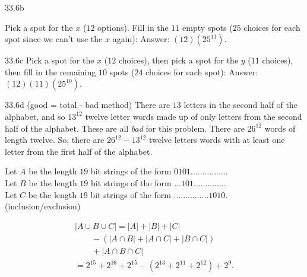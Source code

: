 \begin{Solution}{33.6b}


Pick a spot for the $x$ ($12$ options). Fill in the $11$ empty spots ($25$ choices for each spot since we can't use the $x$
again): Answer: $(12)(25^{11})$.

\end{Solution}

\begin{Solution}{33.6c}
Pick a spot for the $x$ ($12$ choices), then pick a spot for the $y$ ($11$ choices), then fill in the remaining $10$ spots ($24$ choices
for each spot): Answer: $(12)(11)(25^{10})$.
\end{Solution}

\begin{Solution}{33.6d}
(good = total - bad method) There are $13$ letters in the second half of the alphabet, and so $13^{12}$ twelve letter words made up of
only letters from the second half of the alphabet. These are all {\it bad} for this problem. There are $26^{12}$ words of length twelve.
So, there are $26^{12}-13^{12}$ twelve letters words with at least one letter from the first half of the alphabet.
\end{Solution}

\begin{Solution}{33.7}

Let $A$ be the length $19$ bit strings of the form $0101...............$.\\
Let $B$ be the length $19$ bit strings of the form $...101.............$.\\
Let $C$ be the length $19$ bit strings of the form $...............1010$.\\

(inclusion/exclusion)

\begin{align*}
|A \cup B \cup C| = |A| + |B| + |C|\\
\qquad - (|A \cap B| + |A \cap C| + |B \cap C|)\\
\qquad +|A \cap B \cap C|\\
= 2^{15} + 2^{16} + 2^{15} -(2^{13} + 2^{11} + 2^{12}) + 2^9.
\end{align*}


\end{Solution}

